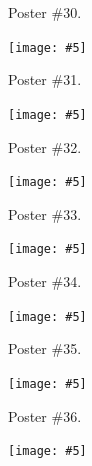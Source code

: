 \documentclass[a4paper,12pt,oneside]{article}
\newcommand{\embed}[5]{\begin{center}\texttt{[image: \#5]}\end{center}\clearpage}
\newcommand{\onlyposter}[1]{\centerline{\small\noindent Poster \##1.}}
\begin{document}
\onlyposter{30}
\embed{2.5cm}{3.5cm}{2.5cm}{2.6cm}{66-aequatus.pdf}

\onlyposter{31}
\embed{2.5cm}{4cm}{2.5cm}{2.75cm}{6-molgenis.pdf}

\onlyposter{32}
\embed{2.5cm}{12cm}{2.5cm}{2.65cm}{13-SPINGO.pdf}

\onlyposter{33}
\embed{2.5cm}{12cm}{1.8cm}{2.85cm}{51-ANNOgesic.pdf}

\onlyposter{34}
\embed{2.5cm}{3.25cm}{2.5cm}{2.8cm}{44-bioxsd.pdf}

\onlyposter{35}
\embed{2.5cm}{12cm}{2.5cm}{2.85cm}{60-mgkit.pdf}

\onlyposter{36}
\embed{2.5cm}{2.5cm}{2cm}{2.65cm}{64-annot-nf.pdf}

\end{document}
